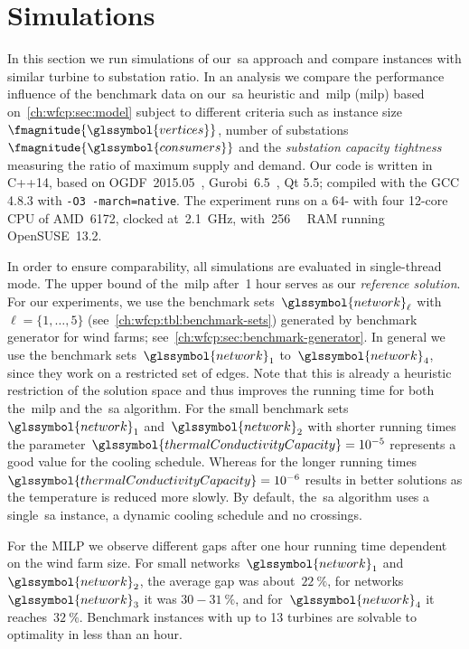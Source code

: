 \section{Simulations}
\label{ch:wfcp:sec:sec:simulations}
%
In this section we run simulations of our~\gls{sa} approach and compare
instances with similar turbine to substation ratio. In an analysis we compare
the performance influence of the benchmark data on our~\gls{sa} heuristic
and~\acrlong{milp} (\gls{milp}) based on~\cref{ch:wfcp:sec:model} subject to
different criteria such as instance size~$\fmagnitude{\glssymbol{vertices}}$,
number of substations~$\fmagnitude{\glssymbol{consumers}}$ and the
\emph{substation capacity tightness} measuring the ratio of maximum supply and
demand. Our code is written in C++14, based on OGDF~2015.05~\parencite{Chi13},
Gurobi~6.5~\parencite{gurobi}, Qt 5.5; compiled with the GCC 4.8.3 with
\texttt{-O3 -march=native}. The experiment runs on a 64-\si{\bit} with four
12-core CPU of AMD~6172, clocked at~\SI{2.1}{\giga\hertz},
with~\SI{256}{\giga\byte} RAM running OpenSUSE~13.2.

In order to ensure comparability, all simulations are evaluated in single-thread
mode. The upper bound of the~\gls{milp} after~1 hour serves as our
\emph{reference solution}. For our experiments, we use the benchmark
sets~$\glssymbol{network}_\ell$ with $\ell=\{1,\dots,5\}$
(see~\cref{ch:wfcp:tbl:benchmark-sets}) generated by benchmark generator for
wind farms; see~\cref{ch:wfcp:sec:benchmark-generator}. In general we use the
benchmark sets~$\glssymbol{network}_1$ to~$\glssymbol{network}_4$, since they
work on a restricted set of edges. Note that this is already a heuristic
restriction of the solution space and thus improves the running time for both
the~\gls{milp} and the~\gls{sa} algorithm. For the small benchmark
sets~$\glssymbol{network}_1$ and~$\glssymbol{network}_2$ with shorter running
times the parameter~$\glssymbol{thermalConductivityCapacity}=10^{-5}$ represents
a good value for the cooling schedule. Whereas for the longer running
times~$\glssymbol{thermalConductivityCapacity}=10^{-6}$ results in better
solutions as the temperature is reduced more slowly. By default, the~\gls{sa}
algorithm uses a single~\gls{sa} instance, a dynamic cooling schedule and no
crossings.

For the MILP we observe different gaps after one hour running time dependent on
the wind farm size. For small networks~$\glssymbol{network}_1$
and~$\glssymbol{network}_2$, the average gap was about~$22~\%$, for
networks~$\glssymbol{network}_3$ it was \mbox{$30-31~\%$}, and
for~$\glssymbol{network}_4$ it reaches~$32~\%$. Benchmark instances with up to
13 turbines are solvable to optimality in less than an hour.

